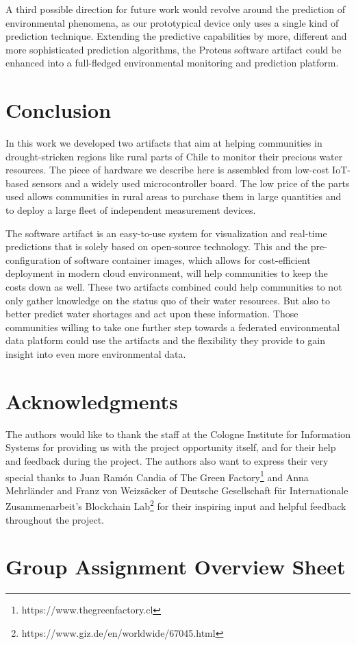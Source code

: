 \documentclass[11pt, letterpaper]{article}
\begin{document}
A third possible direction for future work would revolve around the prediction of environmental phenomena, as our prototypical device only uses a single kind of prediction technique. Extending the predictive capabilities by more, different and more sophisticated prediction algorithms, the Proteus software artifact could be enhanced into a full-fledged environmental monitoring and prediction platform.

\section{Conclusion}
In this work we developed two artifacts that aim at helping communities in drought-stricken regions like rural parts of Chile to monitor their precious water resources. The piece of hardware we describe here is assembled from low-cost IoT-based sensors and a widely used microcontroller board. The low price of the parts used allows communities in rural areas to purchase them in large quantities and to deploy a large fleet of independent measurement devices.
\newline

The software artifact is an easy-to-use system for visualization and real-time predictions that is solely based on open-source technology. This and the pre-configuration of software container images, which allows for cost-efficient deployment in modern cloud environment, will help communities to keep the costs down as well. These two artifacts combined could help communities to not only gather knowledge on the status quo of their water resources. But also to better predict water shortages and act upon these information. Those communities willing to take one further step towards a federated environmental data platform could use the artifacts and the flexibility they provide to gain insight into even more environmental data.


\section{Acknowledgments}
The authors would like to thank the staff at the Cologne Institute for Information Systems for providing us with the project opportunity itself, and for their help and feedback during the project. The authors also want to express their very special thanks to Juan Ramón Candia of The Green Factory\footnote{https://www.thegreenfactory.cl} and Anna Mehrl\"ander and Franz von Weizs\"acker of Deutsche Gesellschaft für Internationale Zusammenarbeit's Blockchain Lab\footnote{https://www.giz.de/en/worldwide/67045.html} for their inspiring input and helpful feedback throughout the project.




\appendix
\section{Group Assignment Overview Sheet}
\end{document}
